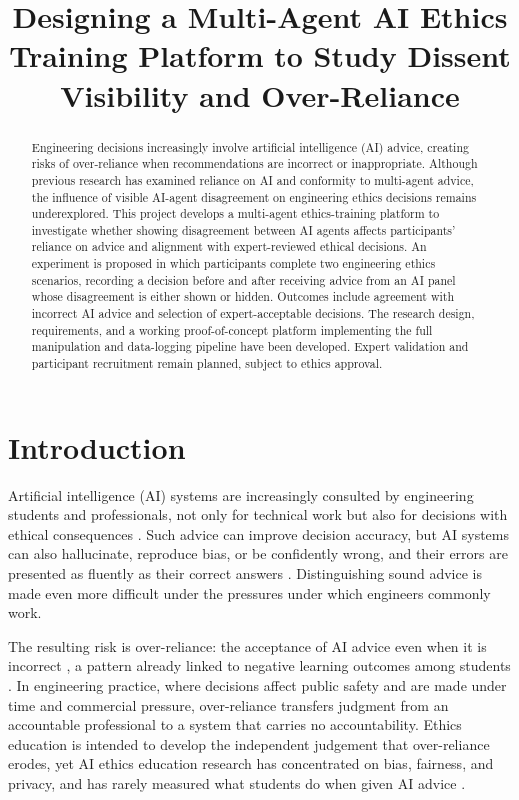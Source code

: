\documentclass[conference]{IEEEtran}
\title{Designing a Multi-Agent AI Ethics Training Platform to Study Dissent Visibility and Over-Reliance}
\author{
  \IEEEauthorblockN{Aryan Cyrus and Ubaid Irfan}
  \IEEEauthorblockA{Department of Software Engineering}
}
\begin{document}
\maketitle

\begin{abstract}
Engineering decisions increasingly involve artificial intelligence (AI) advice, creating risks of over-reliance when recommendations are incorrect or inappropriate. Although previous research has examined reliance on AI and conformity to multi-agent advice, the influence of visible AI-agent disagreement on engineering ethics decisions remains underexplored. This project develops a multi-agent ethics-training platform to investigate whether showing disagreement between AI agents affects participants' reliance on advice and alignment with expert-reviewed ethical decisions. An experiment is proposed in which participants complete two engineering ethics scenarios, recording a decision before and after receiving advice from an AI panel whose disagreement is either shown or hidden. Outcomes include agreement with incorrect AI advice and selection of expert-acceptable decisions. The research design, requirements, and a working proof-of-concept platform implementing the full manipulation and data-logging pipeline have been developed. Expert validation and participant recruitment remain planned, subject to ethics approval.\end{abstract}

\section{Introduction}
Artificial intelligence (AI) systems are increasingly consulted by engineering students and professionals, not only for technical work but also for decisions with ethical consequences \cite{landes2026defermoraladvice}. Such advice can improve decision accuracy, but AI systems can also hallucinate, reproduce bias, or be confidently wrong, and their errors are presented as fluently as their correct answers \cite{ji2023hallucination}. Distinguishing sound advice is made even more difficult under the pressures under which engineers commonly work.

The resulting risk is over-reliance: the acceptance of AI advice even when it is incorrect \cite{bucinca2021trustorthink}, a pattern already linked to negative learning outcomes among students \cite{abubakar2025overreliance}. In engineering practice, where decisions affect public safety and are made under time and commercial pressure, over-reliance transfers judgment from an accountable professional to a system that carries no accountability. Ethics education is intended to develop the independent judgement that over-reliance erodes, yet AI ethics education research has concentrated on bias, fairness, and privacy, and has rarely measured what students do when given AI advice \cite{hillis2026aiethics}.
\end{document}
